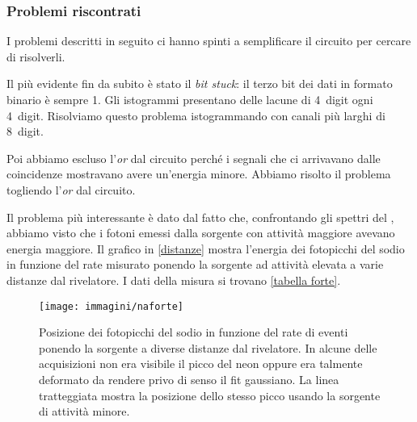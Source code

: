 \subsubsection{Problemi riscontrati}

I problemi descritti in seguito ci hanno spinti a semplificare il circuito per cercare di risolverli.

Il più evidente fin da subito è stato il \emph{bit stuck}: il terzo bit dei dati in formato binario è sempre 1. Gli istogrammi presentano delle lacune di \SI{4}{digit} ogni \SI{4}{digit}. Risolviamo questo problema istogrammando con canali più larghi di \SI{8}{digit}.

Poi abbiamo escluso l'\emph{or} dal circuito perché i segnali che ci arrivavano dalle coincidenze mostravano avere un'energia minore. Abbiamo risolto il problema togliendo l'\emph{or} dal circuito.

Il problema più interessante è dato dal fatto che, confrontando gli spettri del \na{}, abbiamo visto che i fotoni emessi dalla sorgente con attività maggiore avevano energia maggiore.
Il grafico in \autoref{distanze} mostra l'energia dei fotopicchi del sodio in funzione del rate misurato ponendo la sorgente ad attività elevata a varie distanze dal rivelatore.
I dati della misura si trovano \autoref{tabella forte}.


\begin{figure}[h]
\centering
\texttt{[image: immagini/naforte]}
\caption{Posizione dei fotopicchi del sodio in funzione del rate di eventi ponendo la sorgente a diverse distanze dal rivelatore. In alcune delle acquisizioni non era visibile il picco del neon oppure era talmente deformato da rendere privo di senso il fit gaussiano. La linea tratteggiata mostra la posizione dello stesso picco usando la sorgente di attività minore.}
\label{distanze}
\end{figure}

